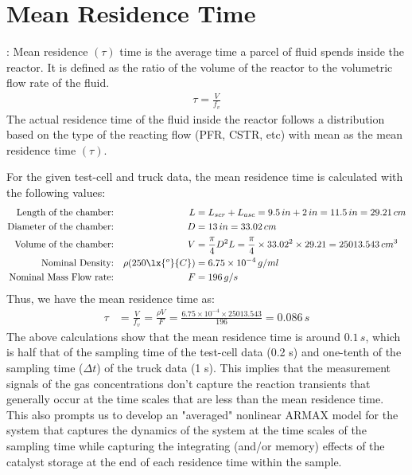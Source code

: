 \newpage
\section{Mean Residence Time}

: Mean residence $(\tau)$ time is the average time a parcel of fluid spends inside the reactor. It is
defined as the ratio of the volume of the reactor to the volumetric flow rate of the fluid.
\begin{align}
    \tau = \frac{V}{f_v}
\end{align}
The actual residence time of the fluid inside the reactor follows a distribution based on the type of the reacting flow
(PFR, CSTR, etc) with mean as the mean residence time $(\tau)$.

For the given test-cell and truck data, the mean residence time is calculated with the following values:
\begin{align*}
    \text{Length of the chamber:}&&
    L &= L_{scr} + L_{asc} = 9.5 \, in  + 2 \, in = 11.5 \, in = 29.21 \, cm\\
    \text{Diameter of the chamber:} &&
    D &= 13 \, in = 33.02 \, cm\\
    \text{Volume of the chamber:} &&
    V &= \frac{\pi}{4} D^2 L = \frac{\pi}{4} \times 33.02^2 \times 29.21 = 25013.543 \, cm^3\\
    \text{Nominal Density:} &&
    \rho(250 \lx{^o}{C}) &= 6.75 \times 10^{-4} \, g/ml\\
    \text{Nominal Mass Flow rate:} &&
    F &= 196 \, g/s
\end{align*}
Thus, we have the mean residence time as:
\begin{align}
    \tau &= \frac{V}{f_v} = \frac{\rho V}{F} = \frac{6.75 \times 10^{-4} \times 25013.543}{196} = 0.086 \, s
\end{align}
The above calculations show that the mean residence time is around $0.1 \, s$, which is half that of the sampling time
of the test-cell data (0.2 s) and one-tenth of the sampling time ($\Delta t$) of the truck data (1 s). This implies that
the measurement signals of the gas concentrations don't capture the reaction transients that generally occur at the time
scales  that are less than the mean residence time. This also prompts us to develop an "averaged" nonlinear ARMAX model
for the system that captures the dynamics of the system at the time scales of the sampling time while capturing the
integrating (and/or memory) effects of the catalyst storage at the end of each residence time within the sample.

